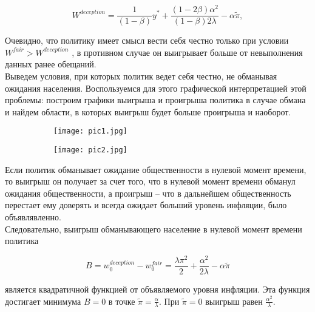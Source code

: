 \begin{equation}
W^{deception} = \frac{1}{(1-\beta)}y^*+\frac{(1-2\beta)\alpha^2}{(1-\beta)2\lambda}-\alpha\tilde{\pi},
\end{equation}

Очевидно, что политику имеет смысл вести себя честно только при условии $W^{fair} > W^{deception}$ , в противном случае он выигрывает больше от невыполнения данных ранее обещаний.
\\

Выведем условия, при которых политик ведет себя честно, не обманывая ожидания населения. Воспользуемся для этого графической интерпретацией этой проблемы: построим графики выигрыша и проигрыша политика в случае обмана и найдем области, в которых выигрыш будет больше проигрыша и наоборот.

\begin{figure}[h]
	
	\begin{subfigure}{0.5\textwidth}
		\texttt{[image: pic1.jpg]} 
		\caption{}
		\label{fig:pic1}
	\end{subfigure}
	\begin{subfigure}{0.5\textwidth}
		\texttt{[image: pic2.jpg]}
		\caption{}
		\label{fig:pic2}
	\end{subfigure}
	
	\caption{}
	\label{fig:image2}
\end{figure}

Если политик обманывает ожидание общественности в нулевой момент времени, то выигрыш он получает за счет того, что в нулевой момент времени обманул ожидания общественности, а проигрыш – что в дальнейшем общественность перестает ему доверять и всегда ожидает больший уровень инфляции, было объявлявленно.
\\

Следовательно, выигрыш обманывающего население в нулевой момент времени политика

\begin{equation}
B=w^{deception}_0 - w^{fair}_0 = \frac{\lambda\pi^2}{2}+\frac{\alpha^2}{2\lambda}-\alpha\tilde{\pi}
\end{equation}

является квадратичной функцией от объявляемого уровня инфляции. Эта функция достигает минимума $B=0$  в точке $\tilde{\pi}=\frac{\alpha}{\lambda}$. При $\tilde{\pi}=0$  выигрыш равен $\frac{\alpha^2}{\lambda}$.
\\

